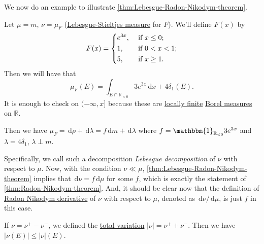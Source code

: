 We now do an example to illustrate \autoref{thm:Lebesgue-Radon-Nikodym-theorem}.
\begin{eg}
	Let \(\mu = m\), \(\nu = \mu_F\) (\hyperref[def:Lebesgue-Stieltjes-measure]{Lebesgue-Stieltjes measure} for \(F\)). We'll define \(F(x)\) by
	\[
		F(x) = \begin{dcases}
			e^{3x}, & \text{ if } x\leq 0 ;   \\
			1,      & \text{ if } 0 < x < 1 ; \\
			5,      & \text{ if } x \geq 1 .
		\end{dcases}
	\]
	Then we will have that
	\[
		\mu_F(E) = \int_{E \cap \mathbb{R}_{< 0}} 3e^{3x} \,\mathrm{d}x + 4 \delta_1(E).
	\]
	It is enough to check on \((-\infty,x]\) because these are \hyperref[def:locally-finite]{locally finite} \hyperref[def:Borel-measure]{Borel measures} on \(\mathbb{R}\).

	Then we have \(\mu_F = \,\mathrm{d}\rho + \,\mathrm{d}\lambda = f\,\mathrm{d}m + \,\mathrm{d}\lambda\) where \(f = \mathbbm{1}_{\mathbb{R}_{< 0}}3e^{3x}\) and \(\lambda = 4\delta_1\),
	\(\lambda \perp m\).
\end{eg}

\hr

Specifically, we call such a decomposition \emph{Lebesgue decomposition} of \(\nu \) with respect to \(\mu \). Now, with the condition \(\nu \ll \mu \), \autoref{thm:Lebesgue-Radon-Nikodym-theorem}
implies that \(\,\mathrm{d} \nu = f \,\mathrm{d} \mu \) for some \(f\), which is exactly the statement of \autoref{thm:Radon-Nikodym-theorem}. And, it should
be clear now that the definition of \hyperref[def:Radon-Nikodym-derivative]{Radon Nikodym derivative} of \(\nu \) with respect to \(\mu \), denoted as
\(\,\mathrm{d} \nu / \,\mathrm{d} \mu \), is just \(f\) in this case.

\begin{prev}
	If \(\nu = \nu^+ - \nu^-\), we defined the \hyperref[def:total-variation]{total variation} \(\left\vert \nu \right\vert = \nu^+ + \nu^-\).
	Then we have \(\left\vert \nu(E) \right\vert \leq \left\vert \nu \right\vert(E)\).
\end{prev}

